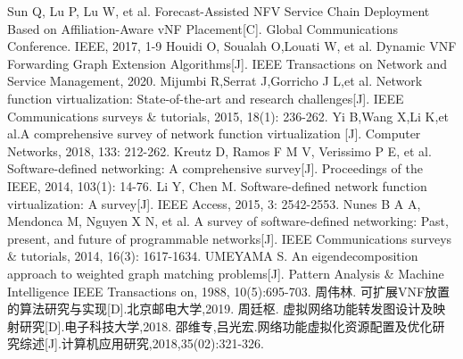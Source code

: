 \begin{thebibliography}{9}
     	Sun Q, Lu P, Lu W, et al. Forecast-Assisted NFV Service Chain Deployment Based on Affiliation-Aware vNF Placement[C]. Global Communications Conference. IEEE, 2017, 1-9
     	Houidi O, Soualah O,Louati W, et al. Dynamic VNF Forwarding Graph Extension Algorithms[J]. IEEE Transactions on Network and Service Management, 2020.
     Mijumbi R,Serrat J,Gorricho J L,et al. Network function virtualization: State-of-the-art and research challenges[J]. IEEE Communications surveys \& tutorials, 2015, 18(1): 236-262.
     	Yi B,Wang X,Li K,et al.A comprehensive survey of network function virtualization [J]. Computer Networks, 2018, 133: 212-262.
     	Kreutz D, Ramos F M V, Verissimo P E, et al. Software-defined networking: A comprehensive survey[J]. Proceedings of the IEEE, 2014, 103(1): 14-76.
     	Li Y, Chen M. Software-defined network function virtualization: A survey[J]. IEEE Access, 2015, 3: 2542-2553.
     	Nunes B A A, Mendonca M, Nguyen X N, et al. A survey of software-defined networking: Past, present, and future of programmable networks[J]. IEEE Communications surveys \& tutorials, 2014, 16(3): 1617-1634.
     	UMEYAMA S. An eigendecomposition approach to weighted graph matching problems[J]. Pattern Analysis \& Machine Intelligence IEEE Transactions on, 1988, 10(5):695-703.
     	周伟林. 可扩展VNF放置的算法研究与实现[D].北京邮电大学,2019.
     	周廷枢. 虚拟网络功能转发图设计及映射研究[D].电子科技大学,2018.
     	邵维专,吕光宏.网络功能虚拟化资源配置及优化研究综述[J].计算机应用研究,2018,35(02):321-326.
\end{thebibliography}



